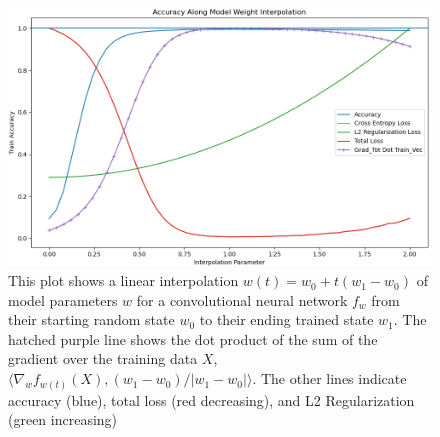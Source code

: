 \begin{figure}[h]
\centering
\includegraphics[width=.45\textwidth]{c4_figures/stab-n-201mnist-C32-100-100-10-0.001-0.0001-eval-mod_int_acc-trn.png}
\caption{This plot shows a linear interpolation $w(t) = w_0 + t(w_{1} - w_0)$ of model parameters $w$ for a convolutional neural network $f_w$ from their starting random state $w_0$ to their ending trained state $w_1$. The hatched purple line shows the dot product of the sum of the  gradient over the training data $X$, $\langle \nabla_w f_{w(t)}(X), (w_1 - w_0)/|w_1 - w_0| \rangle$. The other lines indicate accuracy (blue), total loss (red decreasing), and L2 Regularization (green increasing)}  
\label{fig:grad}
\end{figure}


